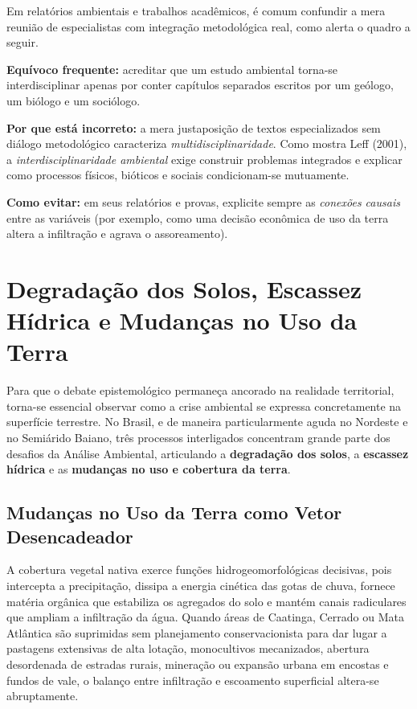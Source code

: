 Em relatórios ambientais e trabalhos acadêmicos, é comum confundir a mera reunião de especialistas com integração metodológica real, como alerta o quadro a seguir.

\begin{boxErro}
\textbf{Equívoco frequente:} acreditar que um estudo ambiental torna-se interdisciplinar apenas por conter capítulos separados escritos por um geólogo, um biólogo e um sociólogo.

\textbf{Por que está incorreto:} a mera justaposição de textos especializados sem diálogo metodológico caracteriza \emph{multidisciplinaridade}. Como mostra Leff (2001), a \emph{interdisciplinaridade ambiental} exige construir problemas integrados e explicar como processos físicos, bióticos e sociais condicionam-se mutuamente.

\textbf{Como evitar:} em seus relatórios e provas, explicite sempre as \emph{conexões causais} entre as variáveis (por exemplo, como uma decisão econômica de uso da terra altera a infiltração e agrava o assoreamento).
\end{boxErro}

\section{Degradação dos Solos, Escassez Hídrica e Mudanças no Uso da Terra}

Para que o debate epistemológico permaneça ancorado na realidade territorial, torna-se essencial observar como a crise ambiental se expressa concretamente na superfície terrestre. No Brasil, e de maneira particularmente aguda no Nordeste e no Semiárido Baiano, três processos interligados concentram grande parte dos desafios da Análise Ambiental, articulando a \textbf{degradação dos solos}, a \textbf{escassez hídrica} e as \textbf{mudanças no uso e cobertura da terra}.

\subsection{Mudanças no Uso da Terra como Vetor Desencadeador}

A cobertura vegetal nativa exerce funções hidrogeomorfológicas decisivas, pois intercepta a precipitação, dissipa a energia cinética das gotas de chuva, fornece matéria orgânica que estabiliza os agregados do solo e mantém canais radiculares que ampliam a infiltração da água. Quando áreas de Caatinga, Cerrado ou Mata Atlântica são suprimidas sem planejamento conservacionista para dar lugar a pastagens extensivas de alta lotação, monocultivos mecanizados, abertura desordenada de estradas rurais, mineração ou expansão urbana em encostas e fundos de vale, o balanço entre infiltração e escoamento superficial altera-se abruptamente.

